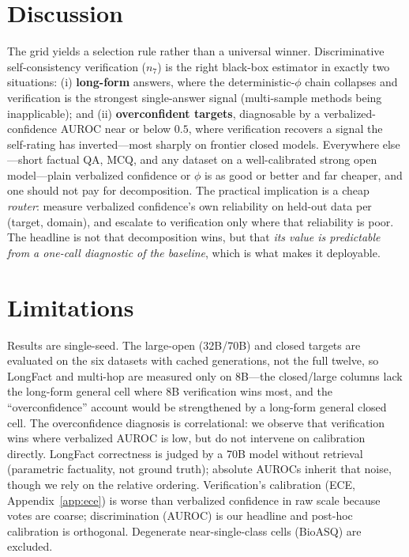 \documentclass[11pt]{article}
\begin{document}
\section{Discussion}
The grid yields a selection rule rather than a universal winner. Discriminative
self-consistency verification ($n_7$) is the right black-box estimator in exactly two
situations: (i) \textbf{long-form} answers, where the deterministic-$\phi$ chain collapses and
verification is the strongest single-answer signal (multi-sample methods being inapplicable);
and (ii) \textbf{overconfident targets}, diagnosable by a verbalized-confidence AUROC near or
below $0.5$, where verification recovers a signal the self-rating has inverted---most sharply on
frontier closed models. Everywhere else---short factual QA, MCQ, and any dataset on a
well-calibrated strong open model---plain verbalized confidence or $\phi$ is as good or better
and far cheaper, and one should not pay for decomposition. The practical implication is a cheap
\emph{router}: measure verbalized confidence's own reliability on held-out data per (target,
domain), and escalate to verification only where that reliability is poor. The headline is not
that decomposition wins, but that \emph{its value is predictable from a one-call diagnostic of
the baseline}, which is what makes it deployable.

\section{Limitations}
Results are single-seed. The large-open (32B/70B) and closed targets are evaluated on the
six datasets with cached generations, not the full twelve, so LongFact and multi-hop are
measured only on 8B---the closed/large columns lack the long-form general cell where 8B
verification wins most, and the ``overconfidence'' account would be strengthened by a
long-form general closed cell. The overconfidence diagnosis is correlational: we observe that
verification wins where verbalized AUROC is low, but do not intervene on calibration directly.
LongFact correctness is judged by a 70B model without retrieval (parametric factuality, not
ground truth); absolute AUROCs inherit that noise, though we rely on the relative ordering.
Verification's calibration (ECE, Appendix~\ref{app:ece}) is worse than verbalized confidence in
raw scale because votes are coarse; discrimination (AUROC) is our headline and post-hoc
calibration is orthogonal. Degenerate near-single-class cells (BioASQ) are excluded.
\end{document}
